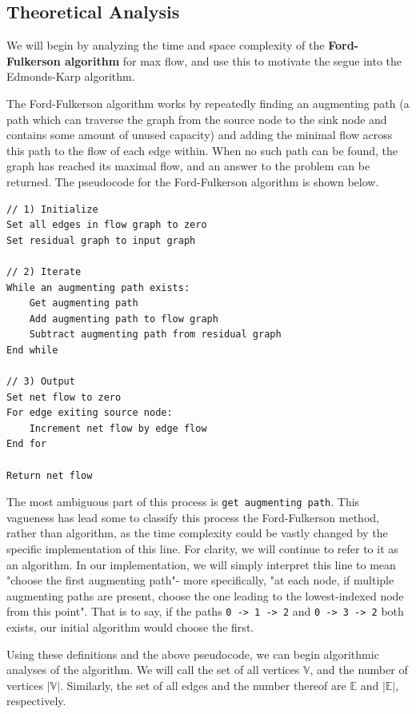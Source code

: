 \documentclass[12pt]{amsart}
\begin{document}
\subsection{Theoretical Analysis}

    We will begin by analyzing the time and space complexity
    of the \textbf{Ford-Fulkerson algorithm} for max flow, and
    use this to motivate the segue into the Edmonds-Karp
    algorithm.

    The Ford-Fulkerson algorithm works by repeatedly finding an
    augmenting path (a path which can traverse the graph from
    the source node to the sink node and contains some amount of
    unused capacity) and adding the minimal flow across this
    path to the flow of each edge within. When no such path can
    be found, the graph has reached its maximal flow, and an
    answer to the problem can be returned. The pseudocode for
    the Ford-Fulkerson algorithm is shown below.

\begin{verbatim}
// 1) Initialize
Set all edges in flow graph to zero
Set residual graph to input graph

// 2) Iterate
While an augmenting path exists:
    Get augmenting path
    Add augmenting path to flow graph
    Subtract augmenting path from residual graph
End while

// 3) Output
Set net flow to zero
For edge exiting source node:
    Increment net flow by edge flow
End for

Return net flow
\end{verbatim}

    The most ambiguous part of this process is
    \verb|get augmenting path|. This vagueness has lead some to
    classify this process the Ford-Fulkerson method, rather than
    algorithm, as the time complexity could be vastly changed by
    the specific implementation of this line. For clarity, we
    will continue to refer to it as an algorithm. In our
    implementation, we will simply interpret this line to mean
    "choose the first augmenting path"- more specifically, 
    "at each node, if multiple augmenting paths are present,
    choose the one leading to the lowest-indexed node from this
    point". That is to say, if the paths \verb|0 -> 1 -> 2| and
    \verb|0 -> 3 -> 2| both exists, our initial algorithm would
    choose the first.

    Using these definitions and the above pseudocode, we can
    begin algorithmic analyses of the algorithm. We will call
    the set of all vertices $\mathbb{V}$, and the number of
    vertices $\vert \mathbb{V} \vert$. Similarly, the set of all
    edges and the number thereof are $\mathbb{E}$ and
    $\vert \mathbb{E} \vert$, respectively.
    
\end{document}
